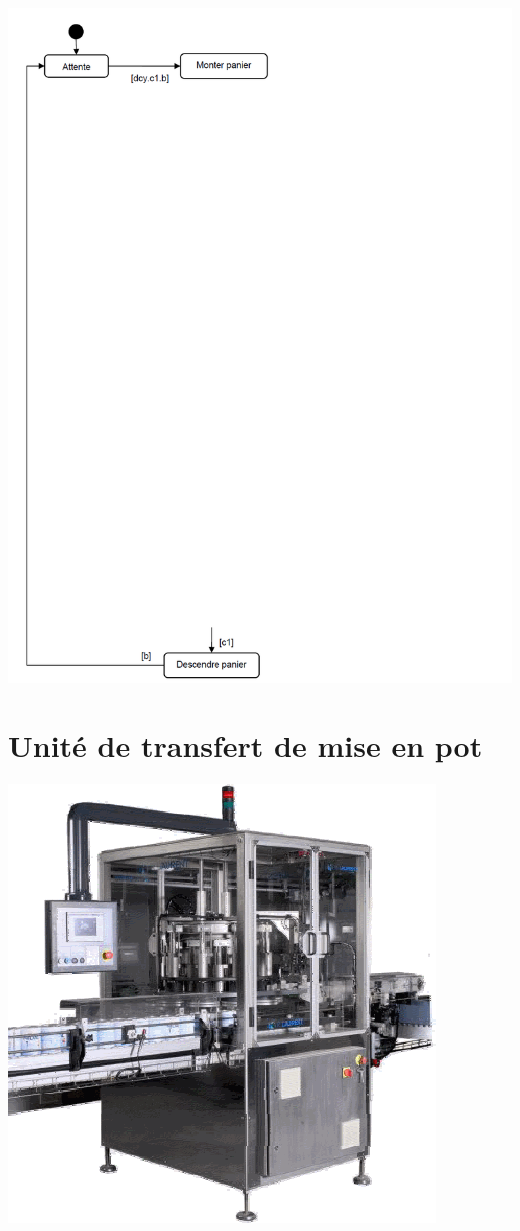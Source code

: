 \documentclass[10pt]{article}
\begin{document}
\begin{center}
\includegraphics[width=.95\textwidth]{images/fig_05}
\end{center}

\newpage

\section*{Unité de transfert de mise en pot}
\begin{center}
\includegraphics[width=.5\textwidth]{images/fig_06}
\end{center}
\setcounter{subparagraph}{0}
\end{document}
